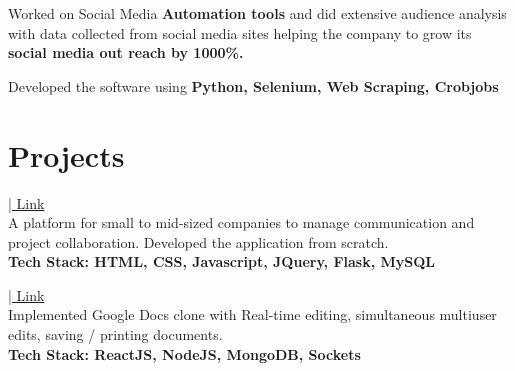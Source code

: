 \documentclass[]{ishaan-kamra-resume}
\begin{document}
\begin{minipage}[t]{0.66\textwidth}
    \begin{tightemize}
        \item Worked on Social Media \textbf{Automation tools} and did extensive audience analysis with data collected from social media sites helping the company to grow its \textbf{social media out reach by 1000\%.}
        \item Developed the software using \textbf{Python, Selenium, Web Scraping, Crobjobs}
    \end{tightemize}
    \sectionsep


    \section{Projects}
    \href{https://github.com/ishaan1091/employee-management-system}{| Link} \\
    A platform for small to mid-sized companies to manage communication and project collaboration. Developed the application from scratch. \\
    \textbf{Tech Stack: HTML, CSS, Javascript, JQuery, Flask, MySQL}
    \sectionsep

    \href{https://github.com/ishaan1091/google-docs-clone}{| Link} \\
    Implemented Google Docs clone with Real-time editing, simultaneous multiuser edits, saving / printing documents. \\
    \textbf{Tech Stack: ReactJS, NodeJS, MongoDB, Sockets}
    \sectionsep



\end{minipage}
\end{document}
